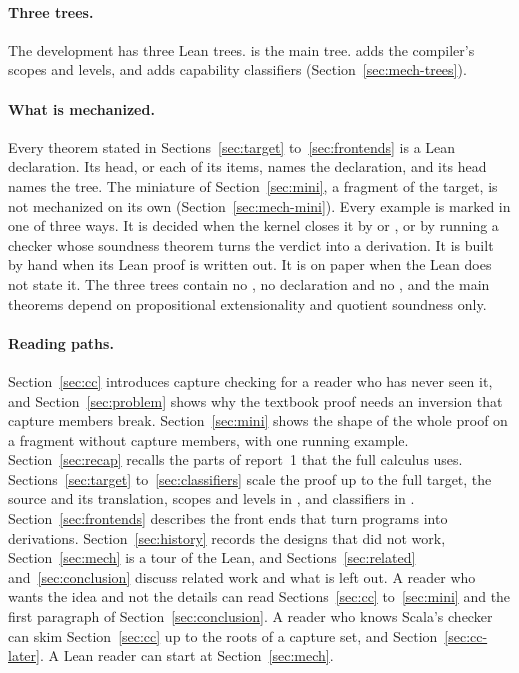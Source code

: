 \paragraph{Three trees.}
The development has three Lean trees. \treeK is the main tree. \treeCC adds the compiler's scopes and levels, and \treeCL adds capability classifiers (Section~\ref{sec:mech-trees}).

\paragraph{What is mechanized.}
Every theorem stated in Sections~\ref{sec:target} to~\ref{sec:frontends} is a Lean declaration. Its head, or each of its items, names the declaration, and its head names the tree. The miniature of Section~\ref{sec:mini}, a fragment of the \treeK target, is not mechanized on its own (Section~\ref{sec:mech-mini}). Every example is marked in one of three ways. It is decided when the kernel closes it by  or , or by running a checker whose soundness theorem turns the verdict into a derivation. It is built by hand when its Lean proof is written out. It is on paper when the Lean does not state it. The three trees contain no , no  declaration and no , and the main theorems depend on propositional extensionality and quotient soundness only.

\paragraph{Reading paths.}
Section~\ref{sec:cc} introduces capture checking for a reader who has never seen it, and Section~\ref{sec:problem} shows why the textbook proof needs an inversion that capture members break. Section~\ref{sec:mini} shows the shape of the whole proof on a fragment without capture members, with one running example. Section~\ref{sec:recap} recalls the parts of report~1 that the full calculus uses. Sections~\ref{sec:target} to~\ref{sec:classifiers} scale the proof up to the full \treeK target, the source and its translation, scopes and levels in \treeCC, and classifiers in \treeCL. Section~\ref{sec:frontends} describes the front ends that turn programs into derivations. Section~\ref{sec:history} records the designs that did not work, Section~\ref{sec:mech} is a tour of the Lean, and Sections~\ref{sec:related} and~\ref{sec:conclusion} discuss related work and what is left out. A reader who wants the idea and not the details can read Sections~\ref{sec:cc} to~\ref{sec:mini} and the first paragraph of Section~\ref{sec:conclusion}. A reader who knows Scala's checker can skim Section~\ref{sec:cc} up to the roots of a capture set, and Section~\ref{sec:cc-later}. A Lean reader can start at Section~\ref{sec:mech}.

